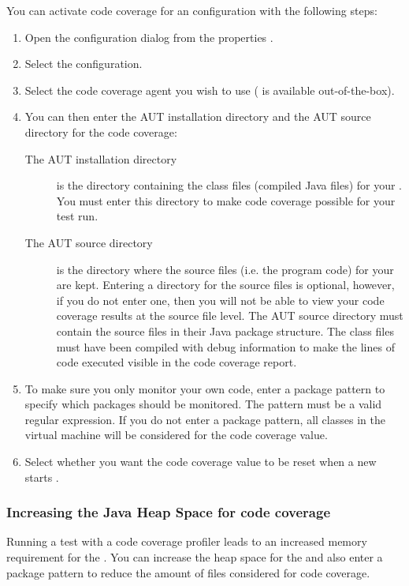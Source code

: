 You can activate code coverage for an \gdaut{} configuration with the following steps:

\begin{enumerate}
\item Open the \gdaut{} configuration dialog from the \gdproject{} properties .
\item Select the  configuration. 
\item Select the code coverage agent you wish to use ( is available out-of-the-box). 
\item You can then enter the AUT installation directory and the AUT source directory for the code coverage:
\begin{description}
\item [The AUT installation directory]{ is the directory containing the class files (compiled Java files) for your \gdaut{}. You must enter this directory to make code coverage possible for your test run.}
\item [The AUT source directory]{ is the directory where the source files (i.e. the program code) for your \gdaut{} are kept. Entering a directory for the source files is optional, however, if you do not enter one, then you will not be able to view your code coverage results at the source file level. The AUT source directory must contain the source files in their Java package structure. The class files must have been compiled with debug information to make the lines of code executed visible in the code coverage report.}
\end{description}
\item To make sure you only monitor your own code, enter a package pattern to specify which packages should be monitored. The pattern must be a valid regular expression. If you do not enter a package pattern, all classes in the virtual machine will be considered for the code coverage value.
\item Select whether you want the code coverage value to be reset when a new \gdsuite{} starts .  
\end{enumerate}


\subsubsection{Increasing the Java Heap Space for code coverage}
\label{CCHeap}
Running a test with a code coverage profiler leads to an increased memory requirement for the \ite{}. You can increase the heap space for the \ite{} and also enter a package pattern  to reduce the amount of files considered for code coverage.  

